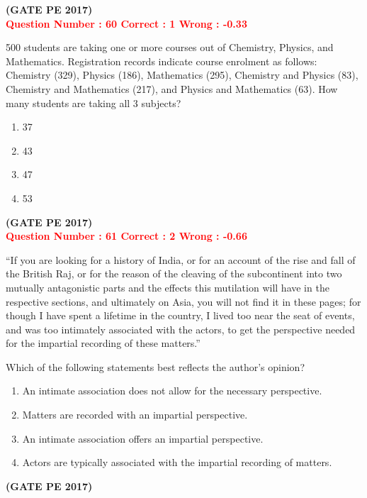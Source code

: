 \documentclass[journal,12pt,onecolumn]{article}
\begin{document}
{\hfill\textbf{(GATE PE 2017)}\\[0.6cm]


\textcolor{red}{\textbf{Question Number : 60 \hfill Correct : 1  Wrong : -0.33}}


500 students are taking one or more courses out of Chemistry, Physics, and Mathematics. Registration records indicate course enrolment as follows: Chemistry (329), Physics (186), Mathematics (295), Chemistry and Physics (83), Chemistry and Mathematics (217), and Physics and Mathematics (63). How many students are taking all 3 subjects?

\begin{enumerate}[label=(\Alph*)]
    \item 37
    \item 43
    \item 47
    \item 53
\end{enumerate}

\hfill\textbf{(GATE PE 2017)}\\[0.6cm]

\textcolor{red}{\textbf{Question Number : 61 \hfill Correct : 2  Wrong : -0.66}}


``If you are looking for a history of India, or for an account of the rise and fall of the British Raj, or for the reason of the cleaving of the subcontinent into two mutually antagonistic parts and the effects this mutilation will have in the respective sections, and ultimately on Asia, you will not find it in these pages; for though I have spent a lifetime in the country, I lived too near the seat of events, and was too intimately associated with the actors, to get the perspective needed for the impartial recording of these matters.''

Which of the following statements best reflects the author’s opinion?

\begin{enumerate}[label=(\Alph*)]
    \item An intimate association does not allow for the necessary perspective.
    \item Matters are recorded with an impartial perspective.
    \item An intimate association offers an impartial perspective.
    \item Actors are typically associated with the impartial recording of matters.
\end{enumerate}

\hfill\textbf{(GATE PE 2017)}\\[0.6cm]


}
\end{document}
